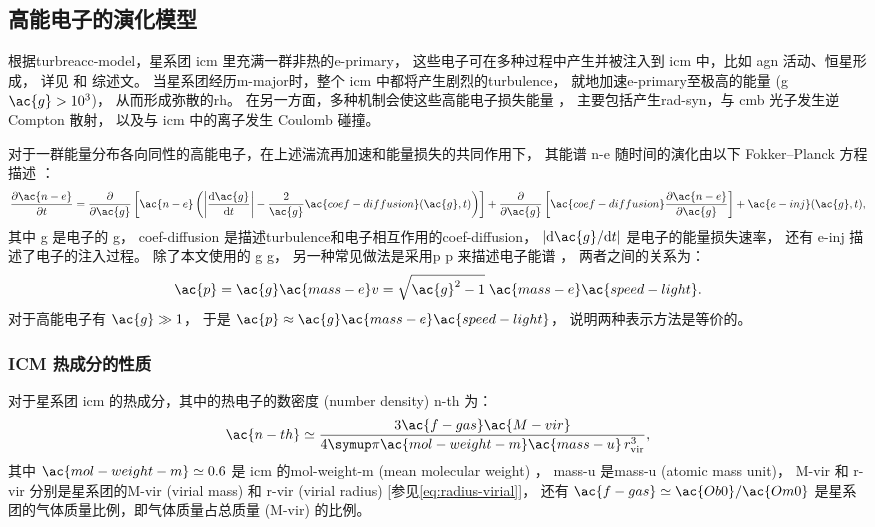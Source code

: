 \subsection{高能电子的演化模型}
\label{sec:halo-evo}

根据\ac{turbreacc-model}，星系团 \ac{icm} 里充满一群非热的\ac{e-primary}，
这些电子可在多种过程中产生并被注入到 \ac{icm} 中，比如 \ac{agn} 活动、恒星形成，
详见  和  综述文。
当星系团经历\ac{m-major}时，整个 \ac{icm} 中都将产生剧烈的\ac{turbulence}，
就地加速\ac{e-primary}至极高的能量 (\acl{g} $\ac{g} > \num{e3}$)，
从而形成弥散的\ac{rh}。
在另一方面，多种机制会使这些高能电子损失能量 \cite{sarazin1999}，
主要包括产生\ac{rad-syn}，与 \ac{cmb} 光子发生逆 Compton 散射，
以及与 \ac{icm} 中的离子发生 Coulomb 碰撞。

对于一群能量分布各向同性的高能电子，在上述湍流再加速和能量损失的共同作用下，
其能谱 \ac{n-e} 随时间的演化由以下 Fokker--Planck 方程描述
\cite{eilek1991,schlickeiser2002}：
\begin{equation}
  \label{eq:fokkerplanck}
  \pdiff{\ac{n-e}}{t} =
    \pdiff{}{\ac{g}} \left[ \ac{n-e} \left(
      \left| \diff{\ac{g}}{t} \right| -
      \frac{2}{\ac{g}} \ac{coef-diffusion}(\ac{g}, t) \right) \right]
    + \pdiff{}{\ac{g}} \left[
      \ac{coef-diffusion} \pdiff{\ac{n-e}}{\ac{g}} \right]
    + \ac{e-inj}(\ac{g}, t) ,
\end{equation}
其中
\ac{g} 是电子的 \acl{g}，
\ac{coef-diffusion} 是描述\ac{turbulence}和电子相互作用的\acl{coef-diffusion}，
$|\R{d}\ac{g} / \R{d}t|$ 是电子的能量损失速率，
还有 \ac{e-inj} 描述了电子的注入过程。
除了本文使用的 \acl{g} \ac{g}，
另一种常见做法是采用\acl{p} \ac{p} 来描述电子能谱 \cite{cassano2005,donnert2014}，
两者之间的关系为：
\begin{equation}
  \ac{p} = \ac{g} \ac{mass-e} v
    = \sqrt{\ac{g}^2 - 1} \; \ac{mass-e} \ac{speed-light} .
\end{equation}
对于高能电子有 $\ac{g} \gg 1$，
于是 $\ac{p} \approx \ac{g} \ac{mass-e} \ac{speed-light}$，
说明两种表示方法是等价的。

\subsubsection{ICM 热成分的性质}

对于星系团 \ac{icm} 的热成分，其中的热电子的数密度 (number density) \ac{n-th} 为：
\begin{equation}
  \label{eq:n-th}
  \ac{n-th} \simeq
    \frac{3 \ac{f-gas} \ac{M-vir}}{
      4\Cpi \ac{mol-weight-m} \ac{mass-u} \,r^3_{\R{vir}}} ,
\end{equation}
其中
$\ac{mol-weight-m} \simeq 0.6$ 是 \ac{icm} 的\acl{mol-weight-m}
(mean molecular weight) \cite{ettori2013}，
\ac{mass-u} 是\acl{mass-u} (atomic mass unit)，
\ac{M-vir} 和 \ac{r-vir} 分别是星系团的\acl{M-vir} (virial mass) 和
\acl{r-vir} (virial radius) [参见\autoref{eq:radius-virial}]，
还有 $\ac{f-gas} \simeq \ac{Ob0}/\ac{Om0}$
是星系团的气体质量比例，即气体质量占总质量 (\ac{M-vir}) 的比例。

